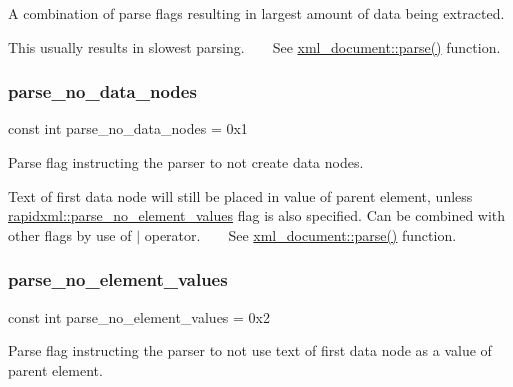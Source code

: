 A combination of parse flags resulting in largest amount of data being extracted. 

This usually results in slowest parsing. ~\newline
~\newline
 See \mbox{\hyperlink{classrapidxml_1_1xml__document_aa280fd704731128b4556b41c1e9182b8}{xml\+\_\+document\+::parse()}} function. \mbox{\label{namespacerapidxml_a87e8bbab53702cf3b438bd553c10b6b9}} 
\subsubsection{\texorpdfstring{parse\+\_\+no\+\_\+data\+\_\+nodes}{parse\_no\_data\_nodes}}
{\footnotesize\ttfamily const int parse\+\_\+no\+\_\+data\+\_\+nodes = 0x1}



Parse flag instructing the parser to not create data nodes. 

Text of first data node will still be placed in value of parent element, unless \mbox{\hyperlink{namespacerapidxml_a97e2c4fdc04fae17126f9971a4fc993e}{rapidxml\+::parse\+\_\+no\+\_\+element\+\_\+values}} flag is also specified. Can be combined with other flags by use of $\vert$ operator. ~\newline
~\newline
 See \mbox{\hyperlink{classrapidxml_1_1xml__document_aa280fd704731128b4556b41c1e9182b8}{xml\+\_\+document\+::parse()}} function. \mbox{\label{namespacerapidxml_a97e2c4fdc04fae17126f9971a4fc993e}} 
\subsubsection{\texorpdfstring{parse\+\_\+no\+\_\+element\+\_\+values}{parse\_no\_element\_values}}
{\footnotesize\ttfamily const int parse\+\_\+no\+\_\+element\+\_\+values = 0x2}



Parse flag instructing the parser to not use text of first data node as a value of parent element. 

